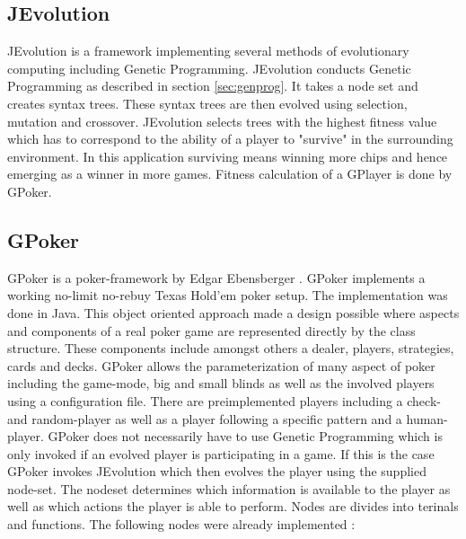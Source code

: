 \documentclass[12pt,fleqn,a4paper]{article}
\begin{document}
\subsection{JEvolution}
JEvolution is a framework implementing several methods of evolutionary computing including Genetic Programming. JEvolution
conducts Genetic Programming as described in section \ref{sec:genprog}. It takes a node set and creates syntax trees. These
syntax trees are then evolved using selection, mutation and crossover. JEvolution selects trees with the highest fitness value which has to correspond to the ability of a player to "survive" in the surrounding environment.
In this application surviving means winning more chips and hence emerging as a winner in more games. Fitness calculation of a GPlayer is done by GPoker. 

\label{gpocker}
\subsection{GPoker}
GPoker is a poker-framework by Edgar Ebensberger \cite{GPoker}. GPoker implements a working no-limit no-rebuy Texas Hold'em poker setup. The implementation was done in Java. This object oriented approach made a design possible where aspects and components of a real poker game are represented directly by the class structure. These components include amongst others a dealer, players, strategies, cards and decks. GPoker allows the parameterization of many aspect of poker including the game-mode, big and small blinds as well as the involved players using a configuration file. There are preimplemented players including a check- and random-player as well as a player following a specific pattern and a human-player.
GPoker does not necessarily have to use Genetic Programming which is only invoked if an evolved player is participating in a game.
If this is the case GPoker invokes JEvolution which then evolves the player using the supplied node-set. The nodeset determines which information is available to the player as well as which actions the player is able to perform. Nodes are divides into terinals and functions. The following nodes were already implemented \cite{GPoker}:
\end{document}
